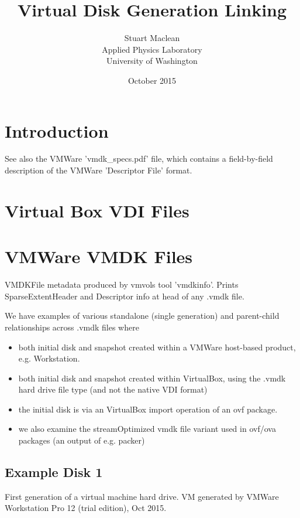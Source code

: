 \documentclass{article}
\title{Virtual Disk Generation Linking}
\author{Stuart Maclean \\
Applied Physics Laboratory \\
University of Washington}
\date{October 2015}
\begin{document}
\maketitle

\section{Introduction}

See also the VMWare 'vmdk\_specs.pdf' file, which contains a
field-by-field description of the VMWare 'Descriptor File' format.

\section{Virtual Box VDI Files}

\section{VMWare VMDK Files}

 VMDKFile metadata produced by vmvols tool 'vmdkinfo'.  Prints
 SparseExtentHeader and Descriptor info at head of any .vmdk file.

We have examples of various standalone (single generation) and
parent-child relationships across .vmdk files where

\begin{itemize}
\item both initial disk and snapshot
  created within a VMWare host-based product, e.g. Workstation.

\item both initial disk and snapshot
  created within VirtualBox, using the .vmdk hard drive file type (and
  not the native VDI format)

\item the initial disk is via an VirtualBox import operation of an ovf
  package.

\item we also examine the streamOptimized vmdk file variant used in
  ovf/ova packages (an output of e.g. packer)
\end{itemize}

\subsection{Example Disk 1}

First generation of a virtual machine hard drive. VM generated by
VMWare Workstation Pro 12 (trial edition), Oct 2015.
\end{document}
